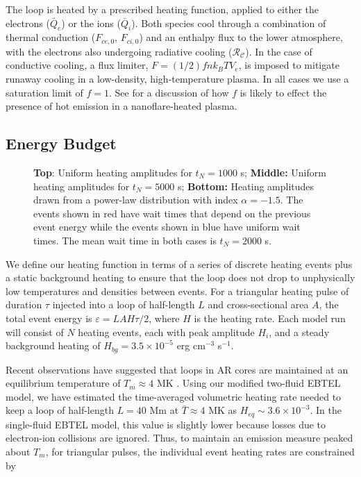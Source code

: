 \documentclass[preprint,linenumbers]{aastex}
\begin{document}
	\par The loop is heated by a prescribed heating function, applied to either the electrons ($\bar{Q}_e$) or the ions ($\bar{Q}_i$). Both species cool through a combination of thermal conduction ($F_{ce,0},\,F_{ci,0}$) and an enthalpy flux to the lower atmosphere, with the electrons also undergoing radiative cooling ($\mathcal{R_C}$). In the case of conductive cooling, a flux limiter, $F=(1/2)fnk_BTV_e$, is imposed to mitigate runaway cooling in a low-density, high-temperature plasma. In all cases we use a saturation limit of $f=1$. See  for a discussion of how $f$ is likely to effect the presence of hot emission in a nanoflare-heated plasma.
	\subsection{Energy Budget}
	\label{subsec:params}
	\begin{figure}
		\caption{\textbf{Top}: Uniform heating amplitudes for $t_N=1000$ s; \textbf{Middle:} Uniform heating amplitudes for $t_N=5000$ s; \textbf{Bottom:} Heating amplitudes drawn from a power-law distribution with index $\alpha=-1.5$. The events shown in red have wait times that depend on the previous event energy while the events shown in blue have uniform wait times. The mean wait time in both cases is $t_N=2000$ s.}
		\label{fig:heating_funcs}
	\end{figure}
	\par We define our heating function in terms of a series of discrete heating events plus a static background heating to ensure that the loop does not drop to unphysically low temperatures and densities between events. For a triangular heating pulse of duration $\tau$ injected into a loop of half-length $L$ and cross-sectional area $A$, the total  event energy is $\varepsilon=LAH\tau/2$, where $H$ is the heating rate. Each model run will consist of $N$ heating events, each with peak amplitude $H_i$, and a steady background heating of $H_{bg}=3.5\times10^{-5}$ erg cm$^{-3}$ s$^{-1}$.
	\par Recent observations have suggested that loops in AR cores are maintained at an equilibrium temperature of $T_{m}\approx4$ MK \citep{warren_constraints_2011,warren_systematic_2012}. Using our modified two-fluid EBTEL model, we have estimated the time-averaged volumetric heating rate needed to keep a loop of half-length $L=40$ Mm at $\bar{T}\approx4$ MK as  $H_{eq}\sim3.6\times10^{-3}$. In the single-fluid EBTEL model, this value is slightly lower because losses due to electron-ion collisions are ignored. Thus, to maintain an emission measure peaked about $T_{m}$, for triangular pulses, the individual event heating rates are constrained by 
\end{document}
